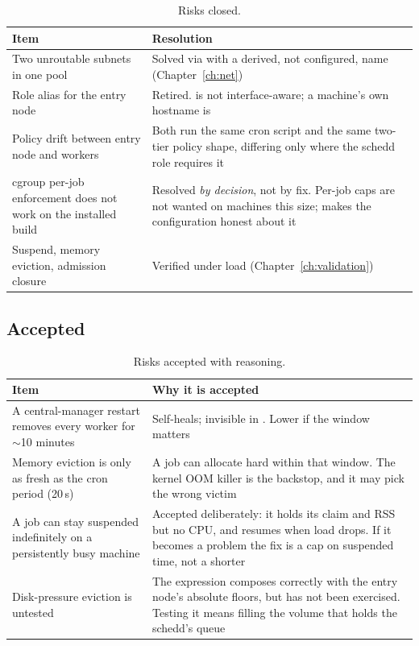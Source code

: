 \begin{table}[H]
\centering
\begin{tabularx}{\textwidth}{L{0.36\textwidth} Y}
\toprule
\textbf{Item} & \textbf{Resolution} \\
\midrule
Two unroutable subnets in one pool & Solved via  with a derived, not configured, name (Chapter~\ref{ch:net}) \\
Role alias for the entry node & Retired.  is not interface-aware; a machine's own hostname is \\
Policy drift between entry node and workers & Both run the same cron script and the same two-tier policy shape, differing only where the schedd role requires it \\
cgroup per-job enforcement does not work on the installed build & Resolved \emph{by decision}, not by fix. Per-job caps are not wanted on machines this size;  makes the configuration honest about it \\
Suspend, memory eviction, admission closure & Verified under load (Chapter~\ref{ch:validation}) \\
\bottomrule
\end{tabularx}
\caption{Risks closed.}
\end{table}

\subsection{Accepted}

\begin{table}[H]
\centering
\begin{tabularx}{\textwidth}{L{0.36\textwidth} Y}
\toprule
\textbf{Item} & \textbf{Why it is accepted} \\
\midrule
A central-manager restart removes every worker for $\sim$10 minutes & Self-heals; invisible in . Lower  if the window matters \\
Memory eviction is only as fresh as the cron period (20\,s) & A job can allocate hard within that window. The kernel OOM killer is the backstop, and it may pick the wrong victim \\
A job can stay suspended indefinitely on a persistently busy machine & Accepted deliberately: it holds its claim and RSS but no CPU, and resumes when load drops. If it becomes a problem the fix is a cap on suspended time, not a shorter  \\
Disk-pressure eviction is untested & The expression composes correctly with the entry node's absolute floors, but has not been exercised. Testing it means filling the volume that holds the schedd's queue \\
\bottomrule
\end{tabularx}
\caption{Risks accepted with reasoning.}
\end{table}

